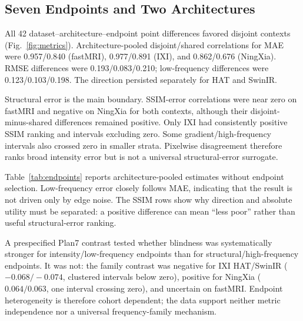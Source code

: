 \documentclass[journal,10pt]{IEEEtran}
\begin{document}
\subsection{Seven Endpoints and Two Architectures}
All 42 dataset--architecture--endpoint point differences favored disjoint contexts (Fig.~\ref{fig:metrics}). Architecture-pooled disjoint/shared correlations for MAE were 0.957/0.840 (fastMRI), 0.977/0.891 (IXI), and 0.862/0.676 (NingXia). RMSE differences were 0.193/0.083/0.210; low-frequency differences were 0.123/0.103/0.198. The direction persisted separately for HAT and SwinIR.

Structural error is the main boundary. SSIM-error correlations were near zero on fastMRI and negative on NingXia for both contexts, although their disjoint-minus-shared differences remained positive. Only IXI had consistently positive SSIM ranking and intervals excluding zero. Some gradient/high-frequency intervals also crossed zero in smaller strata. Pixelwise disagreement therefore ranks broad intensity error but is not a universal structural-error surrogate.

Table~\ref{tab:endpoints} reports architecture-pooled estimates without endpoint selection. Low-frequency error closely follows MAE, indicating that the result is not driven only by edge noise. The SSIM rows show why direction and absolute utility must be separated: a positive difference can mean ``less poor'' rather than useful structural-error ranking.

A prespecified Plan7 contrast tested whether blindness was systematically stronger for intensity/low-frequency endpoints than for structural/high-frequency endpoints. It was not: the family contrast was negative for IXI HAT/SwinIR ($-0.068/-0.074$, clustered intervals below zero), positive for NingXia ($0.064/0.063$, one interval crossing zero), and uncertain on fastMRI. Endpoint heterogeneity is therefore cohort dependent; the data support neither metric independence nor a universal frequency-family mechanism.
\end{document}
